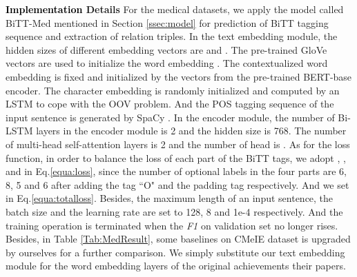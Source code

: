 \documentclass[conference]{IEEEtran}
\newcommand{\yankun}[1]{\textcolor{black}{#1}}
\begin{document}
\textbf{\yankun{Implementation} Details}
For the medical datasets, we apply the model called BiTT-Med mentioned in Section \ref{ssec:model} for prediction of BiTT tagging sequence and extraction of relation triples. In the text embedding module, the hidden sizes of different embedding vectors are  and . The pre-trained GloVe \cite{Pennington2014Glove} vectors are used to initialize the word embedding . The contextualized word embedding  is fixed and initialized by the vectors from the pre-trained BERT-base encoder. The character embedding is randomly initialized and computed by an LSTM \cite{Lample2016Neural} to cope with the OOV problem. And the POS tagging sequence of the input sentence is generated by SpaCy \cite{Honnibal2015An}. In the encoder module, the number of Bi-LSTM layers in the encoder module is 2 and the hidden size is 768. The number of multi-head self-attention layers is 2 and the number of head is . As for the loss function, in order to balance the loss of each part of the BiTT tags, we adopt , ,  and  in Eq.\eqref{equa:loss}, since the number of optional labels in the four parts are 6, 8, 5 and 6 after adding the tag ``O" and the padding tag respectively. And we set  in Eq.\eqref{equa:totalloss}. Besides, the maximum length of an input sentence, the batch size and the learning rate are set to 128, 8 and 1e-4 respectively. And the training operation is terminated when the \emph{F1} on validation set no longer rises. Besides, in Table \ref{Tab:MedResult}, some baselines on CMeIE dataset is upgraded by ourselves for a further comparison. We simply substitute our text embedding module for the word embedding layers of the original achievements their papers.
\end{document}
